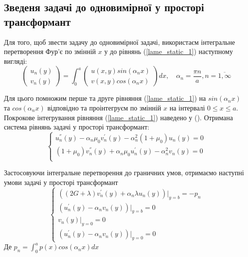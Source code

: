\subsection{Зведеня задачі до одновимірної у просторі трансформант}
Для того, щоб звести задачу до одновимірної задачі, використаєм інтегральне перетворення Фур'є по змінній $x$ у до рівнянь (\ref{lame_static_1}) наступному вигляді:
\begin{equation}
    \begin{pmatrix}
        u_n(y) \\
        v_n(y)
    \end{pmatrix} = \int_{0}^{a} 
    \begin{pmatrix}
        u(x,y) sin(\alpha_n x) \\
        v(x,y) cos(\alpha_n x)
    \end{pmatrix} dx, \quad \alpha_n = \frac{\pi n}{a}, n=\overline{1, \infty}
\end{equation}

Для цього помножим перше та друге рівняння (\ref{lame_static_1}) на $sin(\alpha_n x)$ та $cos(\alpha_n x)$ відповідно та проінтегруєм по змінній $x$ на інтервалі $0 \le x \le a$.
Покрокове інтегрування рівняння (\ref{lame_static_1}) наведено у ().
Отримана система рівнянь задачі у просторі трансформант:
\begin{equation}\label{transf_static_1}
    \begin{cases}
        u_n^{''}(y) - \alpha_n \mu_0 v_n^{'}(y) - \alpha_n^2 (1 + \mu_0) u_n(y) = 0 \\
        (1 + \mu_0) v_n^{''}(y) + \alpha_n \mu_0 u_n^{'}(y)  - \alpha_n^2 v_n(y) = 0 \\
    \end{cases}
\end{equation}

Застосовуючи інтегральне перетворення до граничних умов,
отримаємо наступні умови задачі у просторі трансформант
\begin{equation}\label{transf_bound_1}
    \begin{cases}
        \left( (2G + \lambda)v_n^{'}(y) + \alpha_n \lambda u_n(y) \right)|_{y=b} = -p_n \\
        \left(u_n^{'}(y) - \alpha_n v_n(y)  \right)|_{y=b} = 0 \\
        v_n(y)|_{y=0} = 0 \\
        \left(u_n^{'}(y) - \alpha_n v_n(y)  \right)|_{y=0} = 0
    \end{cases}
\end{equation}
Де $p_n = \int_{0}^{a} p(x) cos(\alpha_n x) dx$

